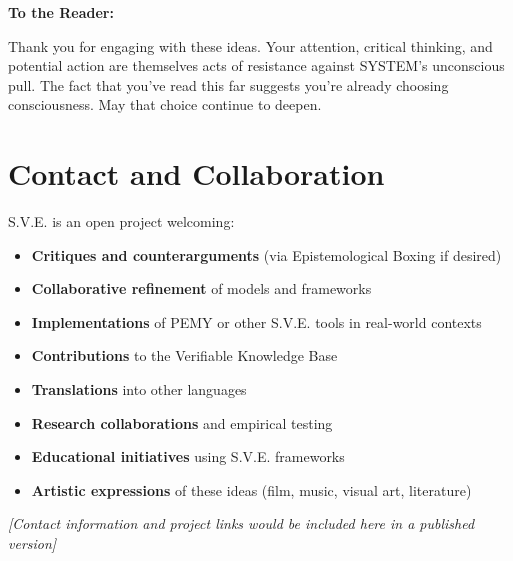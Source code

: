 \documentclass[11pt,a4paper]{article}
\theoremstyle{definition}
\theoremstyle{remark}
\begin{document}
\vspace{1em}

\textbf{To the Reader:}

Thank you for engaging with these ideas. Your attention, critical thinking, and potential action are themselves acts of resistance against SYSTEM's unconscious pull. The fact that you've read this far suggests you're already choosing consciousness. May that choice continue to deepen.

\section{Contact and Collaboration}

S.V.E. is an open project welcoming:

\begin{itemize}
    \item \textbf{Critiques and counterarguments} (via Epistemological Boxing if desired)
    \item \textbf{Collaborative refinement} of models and frameworks
    \item \textbf{Implementations} of PEMY or other S.V.E. tools in real-world contexts
    \item \textbf{Contributions} to the Verifiable Knowledge Base
    \item \textbf{Translations} into other languages
    \item \textbf{Research collaborations} and empirical testing
    \item \textbf{Educational initiatives} using S.V.E. frameworks
    \item \textbf{Artistic expressions} of these ideas (film, music, visual art, literature)
\end{itemize}

\textit{[Contact information and project links would be included here in a published version]}



\end{document}
